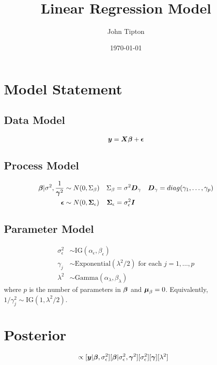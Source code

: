 \documentclass[fleqn]{article}
\title{Linear Regression Model}
\author{John Tipton}
\date{\today}
\def\bm#1{\mbox{\boldmath $#1$}}
\begin{document}
\maketitle

\section{Model Statement}
%
\subsection{Data Model}
\begin{align*}
\bm{y} & = \bm{X} \bm{\beta} + \bm{\epsilon}\\
%
\end{align*}
%
\subsection{Process Model}
%
\begin{align*}
%
\bm{\beta} | \sigma^2, \frac{1} {\bm{\gamma}^2} & \sim N(0, \Sigma_\beta) & \Sigma_\beta & =\sigma^2 \bm{D}_\gamma & \bm{D}_\gamma &  = diag(\gamma_1, \ldots, \gamma_p)\\
%
\bm{\epsilon} & \sim N(0, \bm{\Sigma}_\epsilon) & \bm{\Sigma}_\epsilon &  = \sigma^2_\epsilon \bm{I}\\
%
\end{align*}
%
\subsection{Parameter Model}
%
\begin{align*}
%
\sigma^2_\epsilon & \sim \mbox{IG}(\alpha_\epsilon, \beta_\epsilon)\\
%
\gamma_j & \sim \mbox{Exponential}(\lambda^2/2) \mbox{ for each } j = 1, \ldots, p\\
%
\lambda^2 & \sim \mbox{Gamma}(\alpha_\lambda, \beta_\lambda)
%
\end{align*}
%
where $p$ is the number of parameters in $\bm{\beta}$ and $\bm{\mu}_\beta = 0$. Equivalently, $1 / \gamma^2_j \sim \mbox{IG}(1, \lambda^2 / 2)$.
%
\section{Posterior}
%
\begin{align*}
[\bm{\beta}, \bm{\gamma}^2, \sigma^2_\epsilon, \lambda^2 | \bm{y}] & \propto [\bm{y} | \bm{\beta}, \sigma^2_\epsilon] [\bm{\beta} | \sigma^2_\epsilon, \bm{\gamma}^2] [\sigma^2_\epsilon] [\bm{\gamma}] [\lambda^2]
\end{align*}
%
\end{document}
